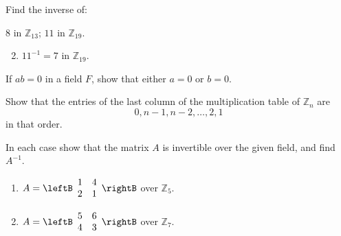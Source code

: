 \begin{multicols}{2}
\begin{ex}
\begin{sol}
\begin{enumerate}[label={\alph*.}]
\end{enumerate}
\end{sol}
\end{ex}


\begin{ex}
Find the inverse of:

\begin{exenumerate}
\exitem $8$ in $\mathbb{Z}_{13}$;
\exitem $11$ in $\mathbb{Z}_{19}$.
\end{exenumerate}
\begin{sol}
\begin{enumerate}[label={\alph*.}]
\setcounter{enumi}{1}
\item  $11^{-1} = 7$ in $\mathbb{Z}_{19}$.

\end{enumerate}
\end{sol}
\end{ex}

\begin{ex}
If $ab = 0$ in a field $F$, show that either $a = 0$ or $b = 0$.
\end{ex}

\begin{ex}
Show that the entries of the last column of the multiplication table of $\mathbb{Z}_n$ are 
\begin{equation*}
0, n - 1, n - 2, \dots, 2, 1
\end{equation*}
 in that order.
\end{ex}

\begin{ex}
In each case show that the matrix $A$ is invertible over the given field, and find $A^{-1}$.

\begin{enumerate}[label={\alph*.}]
\item $A = \leftB \begin{array}{rr}
1 & 4 \\
2 & 1 
\end{array}\rightB$ over $\mathbb{Z}_5$.

\item $A = \leftB \begin{array}{rr}
5 & 6 \\
4 & 3 
\end{array}\rightB$ over $\mathbb{Z}_7$.


\end{enumerate}
\end{ex}
\end{multicols}
